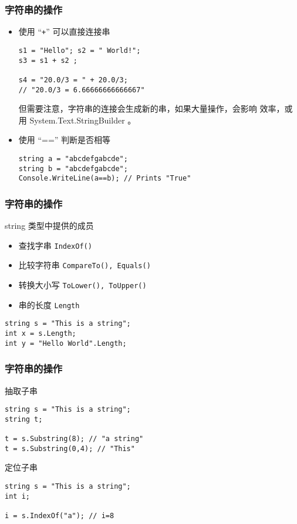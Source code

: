 \begin{frame}[fragile]
\frametitle{字符串的操作}
\begin{itemize}
\item 使用 ``\texttt{+}'' 可以直接连接串
\begin{lstlisting}
s1 = "Hello"; s2 = " World!";
s3 = s1 + s2 ;

s4 = "20.0/3 = " + 20.0/3;
// "20.0/3 = 6.66666666666667"
\end{lstlisting}

  \CJKindent \small 但需要注意，字符串的连接会生成新的串，如果大量操作，会影响
  效率，或用 System.Text.StringBuilder 。
\pause
\item 使用 ``=='' 判断是否相等
\begin{lstlisting}
string a = "abcdefgabcde";
string b = "abcdefgabcde";
Console.WriteLine(a==b); // Prints "True"
\end{lstlisting}
\end{itemize}
\end{frame}

\begin{frame}[fragile]
\frametitle{字符串的操作}
string 类型中提供的成员
\medskip
  \begin{itemize}
\setlength{\itemsep}{6pt plus 1pt}
  \item 查找字串 \texttt{IndexOf()}
  \item 比较字符串 \texttt{CompareTo(), Equals()}
  \item 转换大小写 \texttt{ToLower(), ToUpper()}
  \item 串的长度 \texttt{Length}
  \end{itemize}
\begin{lstlisting}
string s = "This is a string";
int x = s.Length;
int y = "Hello World".Length;
\end{lstlisting}
\end{frame}

\begin{frame}[fragile]
\frametitle{字符串的操作}
抽取子串
\begin{lstlisting}
string s = "This is a string";
string t;

t = s.Substring(8); // "a string"
t = s.Substring(0,4); // "This"
\end{lstlisting}

定位子串
\begin{lstlisting}
string s = "This is a string";
int i;

i = s.IndexOf("a"); // i=8
\end{lstlisting}
\end{frame}

